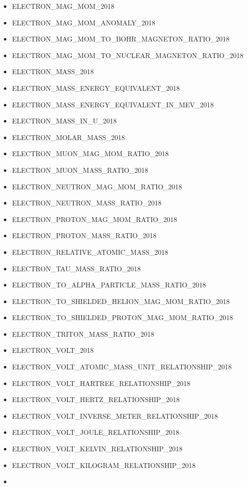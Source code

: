\begin{itemize}
\item
  ELECTRON\_MAG\_MOM\_2018
\item
  ELECTRON\_MAG\_MOM\_ANOMALY\_2018
\item
  ELECTRON\_MAG\_MOM\_TO\_BOHR\_MAGNETON\_RATIO\_2018
\item
  ELECTRON\_MAG\_MOM\_TO\_NUCLEAR\_MAGNETON\_RATIO\_2018
\item
  ELECTRON\_MASS\_2018
\item
  ELECTRON\_MASS\_ENERGY\_EQUIVALENT\_2018
\item
  ELECTRON\_MASS\_ENERGY\_EQUIVALENT\_IN\_MEV\_2018
\item
  ELECTRON\_MASS\_IN\_U\_2018
\item
  ELECTRON\_MOLAR\_MASS\_2018
\item
  ELECTRON\_MUON\_MAG\_MOM\_RATIO\_2018
\item
  ELECTRON\_MUON\_MASS\_RATIO\_2018
\item
  ELECTRON\_NEUTRON\_MAG\_MOM\_RATIO\_2018
\item
  ELECTRON\_NEUTRON\_MASS\_RATIO\_2018
\item
  ELECTRON\_PROTON\_MAG\_MOM\_RATIO\_2018
\item
  ELECTRON\_PROTON\_MASS\_RATIO\_2018
\item
  ELECTRON\_RELATIVE\_ATOMIC\_MASS\_2018
\item
  ELECTRON\_TAU\_MASS\_RATIO\_2018
\item
  ELECTRON\_TO\_ALPHA\_PARTICLE\_MASS\_RATIO\_2018
\item
  ELECTRON\_TO\_SHIELDED\_HELION\_MAG\_MOM\_RATIO\_2018
\item
  ELECTRON\_TO\_SHIELDED\_PROTON\_MAG\_MOM\_RATIO\_2018
\item
  ELECTRON\_TRITON\_MASS\_RATIO\_2018
\item
  ELECTRON\_VOLT\_2018
\item
  ELECTRON\_VOLT\_ATOMIC\_MASS\_UNIT\_RELATIONSHIP\_2018
\item
  ELECTRON\_VOLT\_HARTREE\_RELATIONSHIP\_2018
\item
  ELECTRON\_VOLT\_HERTZ\_RELATIONSHIP\_2018
\item
  ELECTRON\_VOLT\_INVERSE\_METER\_RELATIONSHIP\_2018
\item
  ELECTRON\_VOLT\_JOULE\_RELATIONSHIP\_2018
\item
  ELECTRON\_VOLT\_KELVIN\_RELATIONSHIP\_2018
\item
  ELECTRON\_VOLT\_KILOGRAM\_RELATIONSHIP\_2018
\item

\end{itemize}
